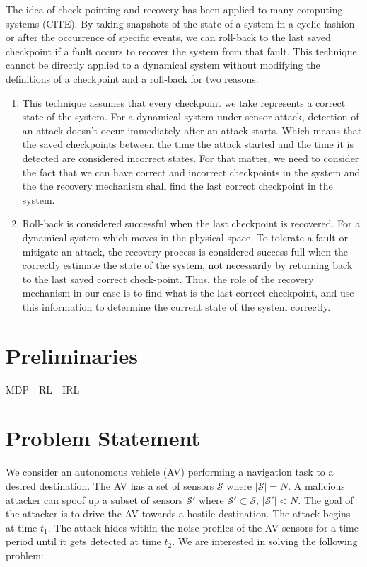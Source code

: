\documentclass[conference]{IEEEtran}
\begin{document}
The idea of check-pointing and recovery has been applied to many computing systems (CITE). By taking snapshots of the state of a system in a cyclic fashion or after the occurrence of specific events, we can roll-back to the last saved checkpoint if a fault occurs to recover the system from that fault. This technique cannot be directly applied to a dynamical system without modifying the definitions of a checkpoint and a roll-back for two reasons. 
\begin{enumerate}
    \item This technique assumes that every checkpoint we take represents a correct state of the system. For a dynamical system under sensor attack, detection of an attack doesn't occur immediately after an attack starts. Which means that the saved checkpoints between the time the attack started and the time it is detected are considered incorrect states. For that matter, we need to consider the fact that we can have correct and incorrect checkpoints in the system and the the recovery mechanism shall find the last correct checkpoint in the system.
    \item Roll-back is considered successful when the last checkpoint is recovered. For a dynamical system which moves in the physical space. To tolerate a fault or mitigate an attack, the recovery process is considered success-full when the correctly estimate the state of the system, not necessarily by returning back to the last saved correct check-point. Thus, the role of the recovery mechanism in our case is to find what is the last correct checkpoint, and use this information to determine the current state of the system correctly.
\end{enumerate}

\section{Preliminaries}\label{sec:Preliminaries}
MDP - RL - IRL
\section{Problem Statement}\label{sec:problem}
We consider an autonomous vehicle (AV) performing a navigation task to a desired destination. The AV has a set of sensors $\mathcal{S}$ where $|\mathcal{S}|=N$. A malicious attacker can spoof up a subset of sensors $\mathcal{S'}$ where $\mathcal{S'} \subset \mathcal{S}$, $|\mathcal{S'}| < N$. The goal of the attacker is to drive the AV towards a hostile destination. The attack begins at time $t_1$. The attack hides within the noise profiles of the AV sensors for a time period until it gets detected at time $t_2$.
We are interested in solving the following problem:
\end{document}
